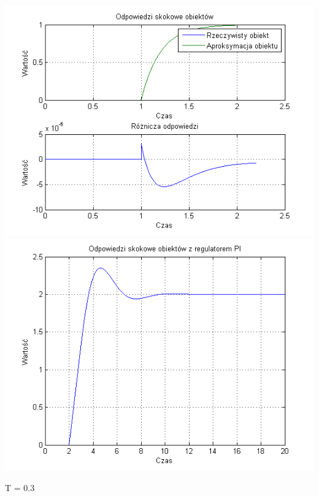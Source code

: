 \documentclass[10pt,a4paper]{article}
\begin{document}
\begin{center}
\includegraphics[scale=1]{images/jeden/skrypt_07.png}\\
\includegraphics[scale=1]{images/jeden/skrypt_08.png}\\
\end{center}
\newpage
T = 0.3
\end{document}

